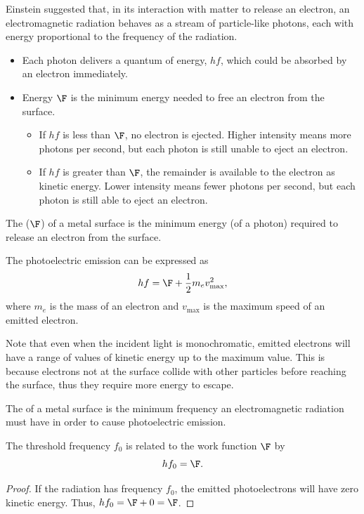 Einstein suggested that, in its interaction with matter to release an electron, an electromagnetic radiation behaves as a stream of particle-like photons, each with energy proportional to the frequency of the radiation.
\begin{itemize}
    \item Each photon delivers a quantum of energy, $hf$, which could be absorbed by an electron immediately.
    \item Energy $\F$ is the minimum energy needed to free an electron from the surface.
    \begin{itemize}
        \item If $hf$ is less than $\F$, no electron is ejected. Higher intensity means more photons per second, but each photon is still unable to eject an electron.
        \item If $hf$ is greater than $\F$, the remainder is available to the electron as kinetic energy. Lower intensity means fewer photons per second, but each photon is still able to eject an electron.
    \end{itemize}
\end{itemize}

\begin{definition}
    The  ($\F$) of a metal surface is the minimum energy (of a photon) required to release an electron from the surface.
\end{definition}

\begin{proposition}
    The photoelectric emission can be expressed as \[hf = \F + \frac12 m_e v_{\text{max}}^2,\] where $m_e$ is the mass of an electron and $v_{\text{max}}$ is the maximum speed of an emitted electron.
\end{proposition}

Note that even when the incident light is monochromatic, emitted electrons will have a range of values of kinetic energy up to the maximum value. This is because electrons not at the surface collide with other particles before reaching the surface, thus they require more energy to escape.

\begin{definition}
    The  of a metal surface is the minimum frequency an electromagnetic radiation must have in order to cause photoelectric emission.
\end{definition}

\begin{proposition}
    The threshold frequency $f_0$ is related to the work function $\F$ by \[hf_0 = \F.\]
\end{proposition}
\begin{proof}
    If the radiation has frequency $f_0$, the emitted photoelectrons will have zero kinetic energy. Thus, $hf_0 = \F + 0 = \F$.
\end{proof}

